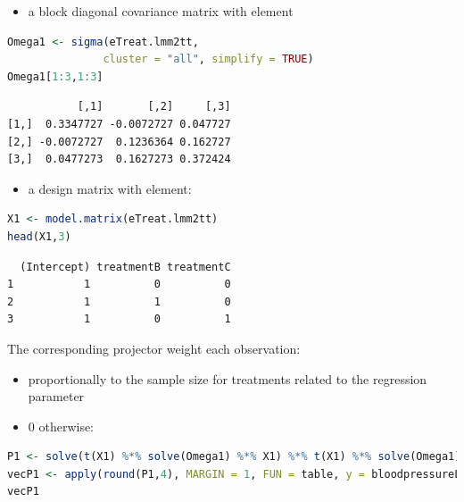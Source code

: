 \documentclass[12pt]{article}
\begin{document}
\begin{minipage}[t]{0.55\linewidth}
\begin{itemize}
\item a block diagonal covariance matrix with element
\end{itemize}
\begin{lstlisting}[language=r,numbers=none]
Omega1 <- sigma(eTreat.lmm2tt,
               cluster = "all", simplify = TRUE)
Omega1[1:3,1:3]
\end{lstlisting}

\label{}
\begin{verbatim}
           [,1]       [,2]     [,3]
[1,]  0.3347727 -0.0072727 0.047727
[2,] -0.0072727  0.1236364 0.162727
[3,]  0.0477273  0.1627273 0.372424
\end{verbatim}

\end{minipage}
\begin{minipage}[t]{0.02\linewidth}
\hphantom{x}
\end{minipage}
\begin{minipage}[t]{0.4\linewidth}
\begin{itemize}
\item a design matrix with element:
\end{itemize}
\begin{lstlisting}[language=r,numbers=none]
X1 <- model.matrix(eTreat.lmm2tt)
head(X1,3)
\end{lstlisting}

\label{}
\begin{verbatim}
  (Intercept) treatmentB treatmentC
1           1          0          0
2           1          1          0
3           1          0          1
\end{verbatim}

\end{minipage}

\noindent The corresponding projector weight each observation:
\begin{itemize}
\item proportionally to the sample size for treatments related to the regression parameter
\item 0 otherwise:
\end{itemize}

\begin{lstlisting}[language=r,numbers=none]
P1 <- solve(t(X1) %*% solve(Omega1) %*% X1) %*% t(X1) %*% solve(Omega1)
vecP1 <- apply(round(P1,4), MARGIN = 1, FUN = table, y = bloodpressureL$treatment)
vecP1
\end{lstlisting}
\end{document}
